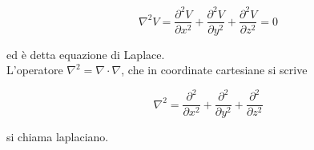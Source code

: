 \begin{tcolorbox}[colback=yellow!10!white, colframe=orange!70!black, boxrule=0.8pt]
\begin{equation}
   \nabla ^2 V = \frac{\partial^2 V}{\partial x^2} + \frac{\partial^2 V}{\partial y^2} + \frac{\partial^2 V}{\partial z^2} = 0
\end{equation}
\end{tcolorbox}

ed  è detta equazione di Laplace.\\

L'operatore  $\nabla^2 = \nabla \cdot \nabla$, che in coordinate cartesiane si scrive 

\begin{equation*}
    \nabla^2 = \frac{\partial^2}{\partial x^2} + \frac{\partial^2}{\partial y^2} + \frac{\partial^2}{\partial z^2}
\end{equation*}

si chiama laplaciano. 
